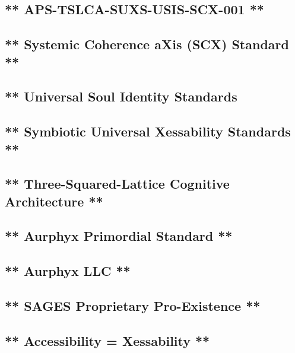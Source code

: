 \subsection{** APS-TSLCA-SUXS-USIS-SCX-001 **}\label{aps-tslca-suxs-usis-scx-001}

\subsection{** Systemic Coherence aXis (SCX) Standard **}\label{systemic-coherence-axis-scx-standard}

\subsection{** Universal Soul Identity Standards}\label{universal-soul-identity-standards}

\subsection{** Symbiotic Universal Xessability Standards **}\label{symbiotic-universal-xessability-standards}

\subsection{** Three-Squared-Lattice Cognitive Architecture **}\label{three-squared-lattice-cognitive-architecture}

\subsection{** Aurphyx Primordial Standard **}\label{aurphyx-primordial-standard}

\subsection{** Aurphyx LLC **}\label{aurphyx-llc}

\subsection{** SAGES \textbar{} Proprietary \textbar{} Pro-Existence **}\label{sages-proprietary-pro-existence}

\subsection{** Accessibility = Xessability **}\label{accessibility-xessability}

